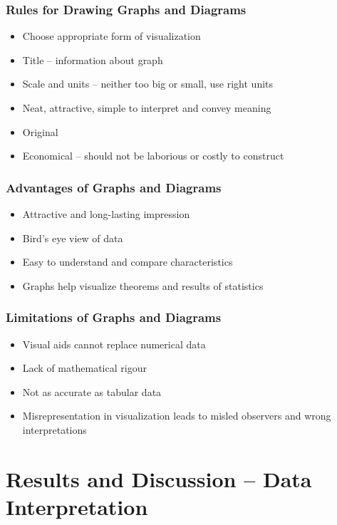 \documentclass{article}
\begin{document}
\subsubsection{Rules for Drawing Graphs and Diagrams}

\begin{itemize}
    \item Choose appropriate form of visualization
    \item Title -- information about graph
    \item Scale and units -- neither too big or small, use right units
    \item Neat, attractive, simple to interpret and convey meaning
    \item Original
    \item Economical -- should not be laborious or costly to construct
\end{itemize}

\subsubsection{Advantages of Graphs and Diagrams}

\begin{itemize}
    \item Attractive and long-lasting impression
    \item Bird's eye view of data
    \item Easy to understand and compare characteristics
    \item Graphs help visualize theorems and results of statistics
\end{itemize}

\subsubsection{Limitations of Graphs and Diagrams}

\begin{itemize}
    \item Visual aids cannot replace numerical data
    \item Lack of mathematical rigour
    \item Not as accurate as tabular data
    \item Misrepresentation in visualization leads to misled observers and wrong interpretations
\end{itemize}

\section{Results and Discussion -- Data Interpretation}
\end{document}
